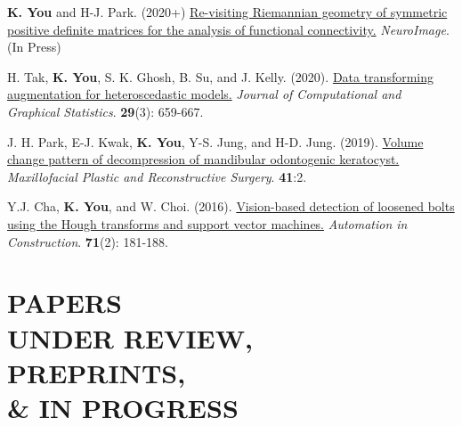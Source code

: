 \documentclass[margin, 10pt]{res} %
\begin{document}
\begin{resume}
\begin{enumerate}[label={[\arabic*]}]
	\item {\bf K. You} and H-J. Park. (2020+) \href{https://doi.org/10.1016/j.neuroimage.2020.117464}{Re-visiting Riemannian geometry of symmetric positive definite matrices for the analysis of functional connectivity.} \textit{NeuroImage}. (In Press)
	\item H. Tak, {\bf K. You}, S. K. Ghosh, B. Su, and J. Kelly. (2020). \href{https://doi.org/10.1080/10618600.2019.1704295}{Data transforming augmentation for heteroscedastic models.} {\it Journal of Computational and Graphical Statistics}. {\bf 29}(3): 659-667. 
	\item J. H. Park, E-J. Kwak, {\bf K. You}, Y-S. Jung, and H-D. Jung. (2019).
	\href{https://rdcu.be/bfKR8}{Volume change pattern of decompression of mandibular odontogenic keratocyst.} {\it Maxillofacial Plastic and Reconstructive Surgery}. {\bf 41}:2.	
	\item Y.J. Cha, {\bf K. You}, and W. Choi. (2016). \href{https://doi.org/10.1016/j.autcon.2016.06.008}{Vision-based detection of loosened bolts using the Hough transforms and support vector machines.} {\it Automation in Construction}. {\bf 71}(2): 181-188.
\end{enumerate}
\vspace{.2cm}


\section{\sf PAPERS \\ UNDER REVIEW, \\PREPRINTS, \\ \& IN PROGRESS} 


\end{resume}
\end{document}
